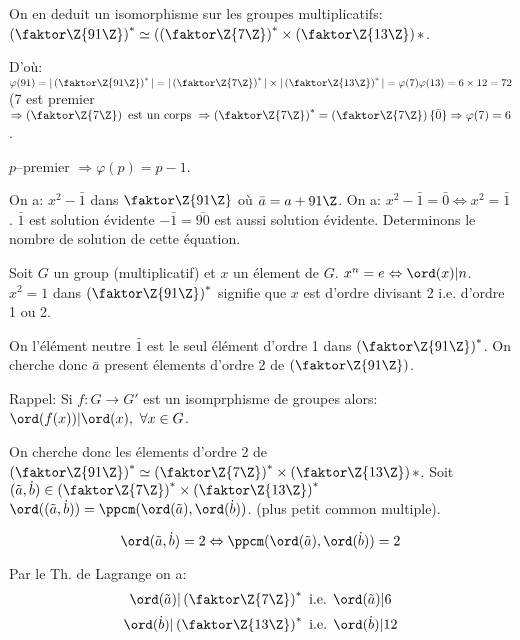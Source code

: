 On en deduit un isomorphisme sur les groupes multiplicatifs: $\left(\faktor\Z{91\Z}\right)^\ast\simeq(\left(\faktor\Z{7\Z}\right)^\ast\times \left(\faktor\Z{13\Z}\right)
\ast$. 

D'où: $\varphi (91)=|\left(\faktor\Z{91\Z}\right)^\ast |=|\left(\faktor\Z{7\Z}\right)^\ast|\times|\left(\faktor\Z{13\Z}\right)^\ast|= \varphi (7)\varphi (13)=6\times 12=72$
(7 est premier $\Rightarrow \left(\faktor\Z{7\Z}\right) \text{ est un corps } \Rightarrow \left(\faktor\Z{7\Z}\right)^\ast=\left(\faktor\Z{7\Z}\right)\\ \{\bar 0\} \Rightarrow \varphi (7)=6$.

$p$--premier $\Rightarrow \varphi (p)=p-1$.

On a: $x^2-\bar 1$ dans $\faktor\Z{91\Z}$ où $\bar a=a+91\Z$. On a: $x^2-\bar 1 =\bar 0 \Leftrightarrow x^2=\bar 1$. $\bar 1$ est solution évidente $-\bar 1=\overline{90}$ est aussi solution évidente. Determinons le nombre de solution de cette équation.

\begin{remark}
	Soit $G$ un group (multiplicatif) et $x$ un élement de $G$. $x^n=e\Leftrightarrow \ord(x)|n$. $x^2=1$ dans $\left(\faktor\Z{91\Z}\right)^\ast$ signifie que $x$ est d'ordre divisant 2 i.e. d'ordre 1 ou 2.
	
	On l'élément neutre $\bar 1$ est le seul élément d'ordre 1 dans $\left(\faktor\Z{91\Z}\right)^\ast$. On cherche donc $\bar a$ present élements d'ordre 2 de $\left(\faktor\Z{91\Z}\right)$. 
\end{remark}

Rappel: Si $f:G\rightarrow G'$ est un isomprphisme de groupes alors: $\ord(f(x))|\ord(x),\ \forall x\in G$.

On cherche donc les élements d'ordre 2 de $\left(\faktor\Z{91\Z}\right)^\ast\simeq \left(\faktor\Z{7\Z}\right)^\ast\times \left(\faktor\Z{13\Z}\right)
\ast$. Soit $(\tilde a, \dot b)\in \left( \faktor\Z{7\Z} \right)^\ast \times \left( \faktor\Z{13\Z} \right)^\ast$ $\ord((\tilde a,\dot b))=\ppcm(\ord(\tilde a),\ord(\dot b))$. (plus petit common multiple).

$$\ord(\tilde a, \dot b)=2\Leftrightarrow \ppcm(\ord(\tilde a),\ord(\dot b))=2$$

Par le Th. de Lagrange on a:
$$ \ord(\tilde a)|\left(\faktor\Z{7\Z}\right)^\ast\mbox{ i.e. } \ord(\tilde a)|6$$
$$\ord(\dot b) | \left(\faktor\Z{13\Z}\right)^\ast \mbox{ i.e. } \ord(\dot b) | 12$$

